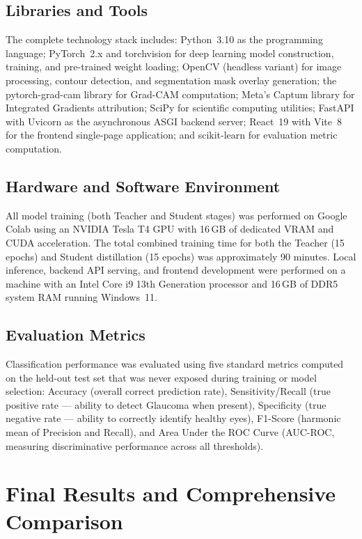\documentclass[conference]{IEEEtran}
\begin{document}
\subsection{Libraries and Tools}
The complete technology stack includes: Python~3.10 as the programming language; PyTorch~2.x and torchvision for deep learning model construction, training, and pre-trained weight loading; OpenCV (headless variant) for image processing, contour detection, and segmentation mask overlay generation; the pytorch-grad-cam library for Grad-CAM computation; Meta's Captum library for Integrated Gradients attribution; SciPy for scientific computing utilities; FastAPI with Uvicorn as the asynchronous ASGI backend server; React~19 with Vite~8 for the frontend single-page application; and scikit-learn for evaluation metric computation.

\subsection{Hardware and Software Environment}
All model training (both Teacher and Student stages) was performed on Google Colab using an NVIDIA Tesla T4 GPU with 16\,GB of dedicated VRAM and CUDA acceleration. The total combined training time for both the Teacher (15 epochs) and Student distillation (15 epochs) was approximately 90 minutes. Local inference, backend API serving, and frontend development were performed on a machine with an Intel Core i9 13th Generation processor and 16\,GB of DDR5 system RAM running Windows~11.

\subsection{Evaluation Metrics}
Classification performance was evaluated using five standard metrics computed on the held-out test set that was never exposed during training or model selection: Accuracy (overall correct prediction rate), Sensitivity/Recall (true positive rate --- ability to detect Glaucoma when present), Specificity (true negative rate --- ability to correctly identify healthy eyes), F1-Score (harmonic mean of Precision and Recall), and Area Under the ROC Curve (AUC-ROC, measuring discriminative performance across all thresholds).

\section{Final Results and Comprehensive Comparison}
\end{document}
